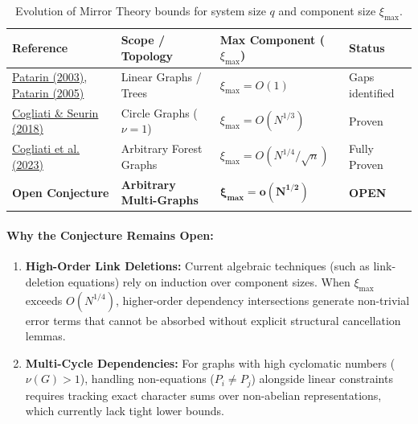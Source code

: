 \documentclass[11pt,a4paper]{article}
\begin{document}
\begin{table}[h!]
\centering
\small
\begin{tabular}{@{}llll@{}}
\toprule
\textbf{Reference} & \textbf{Scope / Topology} & \textbf{Max Component ($\xi_{\max}$)} & \textbf{Status} \\ \midrule
\href{https://iacr.org/archive/crypto2003/27290510/27290510.pdf}{Patarin (2003)}, \href{https://doi.org/10.1007/11734727_25}{Patarin (2005)} & Linear Graphs / Trees & $\xi_{\max} = O(1)$ & Gaps identified \\
\href{https://yannickseurin.github.io/assets/papers/CogliatiS18_DCC.pdf}{Cogliati \& Seurin (2018)} & Circle Graphs ($\nu=1$) & $\xi_{\max} = O(N^{1/3})$ & Proven \\
\href{https://eprint.iacr.org/2022/686}{Cogliati et al. (2023)} & Arbitrary Forest Graphs & $\xi_{\max} = O(N^{1/4}/\sqrt{n})$ & Fully Proven \\
\textbf{Open Conjecture} & \textbf{Arbitrary Multi-Graphs} & $\mathbf{\xi_{\max} = o(N^{1/2})}$ & \textbf{OPEN} \\ \bottomrule
\end{tabular}
\caption{Evolution of Mirror Theory bounds for system size $q$ and component size $\xi_{\max}$.}
\end{table}

\paragraph{Why the Conjecture Remains Open:}
\begin{enumerate}
    \item \textbf{High-Order Link Deletions:} Current algebraic techniques (such as link-deletion equations) rely on induction over component sizes. When $\xi_{\max}$ exceeds $O(N^{1/4})$, higher-order dependency intersections generate non-trivial error terms that cannot be absorbed without explicit structural cancellation lemmas.
    \item \textbf{Multi-Cycle Dependencies:} For graphs with high cyclomatic numbers ($\nu(G) > 1$), handling non-equations ($P_i \neq P_j$) alongside linear constraints requires tracking exact character sums over non-abelian representations, which currently lack tight lower bounds.
\end{enumerate}
\end{document}
